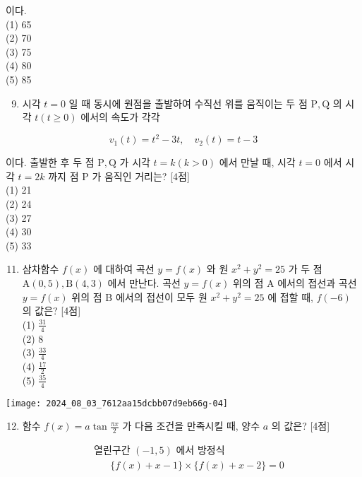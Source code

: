 \documentclass[10pt]{article}
\begin{document}
이다.\\
(1) 65\\
(2) 70\\
(3) 75\\
(4) 80\\
(5) 85

\begin{enumerate}
  \setcounter{enumi}{8}
  \item 시각 \(t=0\) 일 때 동시에 원점을 출발하여 수직선 위를 움직이는 두 점 \(\mathrm{P}, \mathrm{Q}\) 의 시각 \(t(t \geq 0)\) 에서의 속도가 각각
\end{enumerate}

\[
v_{1}(t)=t^{2}-3 t, \quad v_{2}(t)=t-3
\]

이다. 출발한 후 두 점 \(\mathrm{P}, \mathrm{Q}\) 가 시각 \(t=k(k>0)\) 에서 만날 때, 시각 \(t=0\) 에서 시각 \(t=2 k\) 까지 점 P 가 움직인 거리는? [4점]\\
(1) 21\\
(2) 24\\
(3) 27\\
(4) 30\\
(5) 33

\begin{enumerate}
  \setcounter{enumi}{10}
  \item 삼차함수 \(f(x)\) 에 대하여 곡선 \(y=f(x)\) 와 원 \(x^{2}+y^{2}=25\) 가 두 점 \(\mathrm{A}(0,5), \mathrm{B}(4,3)\) 에서 만난다. 곡선 \(y=f(x)\) 위의 점 A 에서의 접선과 곡선 \(y=f(x)\) 위의 점 B 에서의 접선이 모두 원 \(x^{2}+y^{2}=25\) 에 접할 때, \(f(-6)\) 의 값은? [4점]\\
(1) \(\frac{31}{4}\)\\
(2) 8\\
(3) \(\frac{33}{4}\)\\
(4) \(\frac{17}{2}\)\\
(5) \(\frac{35}{4}\)
\end{enumerate}

\begin{center}
\texttt{[image: 2024\_08\_03\_7612aa15dcbb07d9eb66g-04]}
\end{center}

\begin{enumerate}
  \setcounter{enumi}{11}
  \item 함수 \(f(x)=a \tan \frac{\pi x}{2}\) 가 다음 조건을 만족시킬 때, 양수 \(a\) 의 값은? [4점]
\end{enumerate}

\[
\begin{aligned}
& \text { 열린구간 }(-1,5) \text { 에서 방정식 } \\
& \qquad\{f(x)+x-1\} \times\{f(x)+x-2\}=0
\end{aligned}
\]
\end{document}
